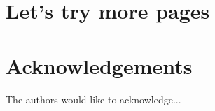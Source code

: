 \documentclass[a4paper,10pt,twoside,twocolumn,final]{JICS_LaTexGuidelines} %
\begin{document}
\section{Let's try more pages}
\lipsum

\lipsum

\lipsum

\lipsum

\lipsum

\lipsum

\lipsum

\lipsum

\lipsum

\lipsum

\lipsum

\lipsum

\lipsum

\lipsum
\setcounter{secnumdepth}{0}
\section{Acknowledgements}
The authors would like to acknowledge...

\end{document}
